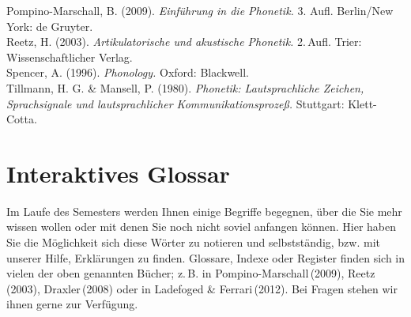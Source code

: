 Pompino-Marschall, B. (2009). \emph{Einführung in die Phonetik.} 3. Aufl. Berlin/New York: de Gruyter.  \newline\\
Reetz, H. (2003). \emph{Artikulatorische und akustische Phonetik.} 2.\,Aufl. Trier: Wissenschaftlicher Verlag.  \newline\\
Spencer, A. (1996). \emph{Phonology.} Oxford: Blackwell.\newline\\
Tillmann, H. G. \& Mansell, P. (1980). \emph{Phonetik: Lautsprachliche Zeichen, Sprachsignale und lautsprachlicher Kommunikationsprozeß.} Stuttgart: Klett-Cotta. \newline\\

\section{Interaktives Glossar}

Im Laufe des Semesters werden Ihnen einige Begriffe begegnen, über die Sie mehr wissen wollen oder mit denen Sie noch nicht soviel anfangen können. Hier haben Sie die Möglichkeit sich diese Wörter zu notieren und selbstständig, bzw. mit unserer Hilfe, Erklärungen zu finden. Glossare, Indexe oder Register finden sich in vielen der oben genannten Bücher; z.\,B. in Pompino-Marschall\,(2009), Reetz\,(2003), Draxler\,(2008) oder in Ladefoged \& Ferrari\,(2012). Bei Fragen stehen wir ihnen gerne zur Verfügung.  


